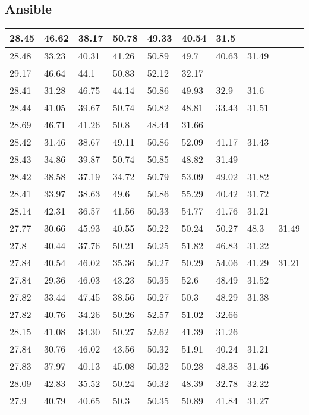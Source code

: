 \subsection{Ansible}
\label{dataset:deploytijden:ansible}
\begin{longtable}{ | l | l | l | l | l | l | l | l | l | }
\hline
	28.45 & 46.62 & 38.17 & 50.78 & 49.33 & 40.54 & 31.5 &  &  \\ \hline
	28.48 & 33.23 & 40.31 & 41.26 & 50.89 & 49.7 & 40.63 & 31.49 &  \\ \hline
	29.17 & 46.64 & 44.1 & 50.83 & 52.12 & 32.17 &  &  &  \\ \hline
	28.41 & 31.28 & 46.75 & 44.14 & 50.86 & 49.93 & 32.9 & 31.6 &  \\ \hline
	28.44 & 41.05 & 39.67 & 50.74 & 50.82 & 48.81 & 33.43 & 31.51 &  \\ \hline
	28.69 & 46.71 & 41.26 & 50.8 & 48.44 & 31.66 &  &  &  \\ \hline
	28.42 & 31.46 & 38.67 & 49.11 & 50.86 & 52.09 & 41.17 & 31.43 &  \\ \hline
	28.43 & 34.86 & 39.87 & 50.74 & 50.85 & 48.82 & 31.49 &  &  \\ \hline
	28.42 & 38.58 & 37.19 & 34.72 & 50.79 & 53.09 & 49.02 & 31.82 &  \\ \hline
	28.41 & 33.97 & 38.63 & 49.6 & 50.86 & 55.29 & 40.42 & 31.72 &  \\ \hline
	28.14 & 42.31 & 36.57 & 41.56 & 50.33 & 54.77 & 41.76 & 31.21 &  \\ \hline
	27.77 & 30.66 & 45.93 & 40.55 & 50.22 & 50.24 & 50.27 & 48.3 & 31.49 \\ \hline
	27.8 & 40.44 & 37.76 & 50.21 & 50.25 & 51.82 & 46.83 & 31.22 &  \\ \hline
	27.84 & 40.54 & 46.02 & 35.36 & 50.27 & 50.29 & 54.06 & 41.29 & 31.21 \\ \hline
	27.84 & 29.36 & 46.03 & 43.23 & 50.35 & 52.6 & 48.49 & 31.52 &  \\ \hline
	27.82 & 33.44 & 47.45 & 38.56 & 50.27 & 50.3 & 48.29 & 31.38 &  \\ \hline
	27.82 & 40.76 & 34.26 & 50.26 & 52.57 & 51.02 & 32.66 &  &  \\ \hline
	28.15 & 41.08 & 34.30 & 50.27 & 52.62 & 41.39 & 31.26 &  &  \\ \hline
	27.84 & 30.76 & 46.02 & 43.56 & 50.32 & 51.91 & 40.24 & 31.21 &  \\ \hline
	27.83 & 37.97 & 40.13 & 45.08 & 50.32 & 50.28 & 48.38 & 31.46 &  \\ \hline
	28.09 & 42.83 & 35.52 & 50.24 & 50.32 & 48.39 & 32.78 & 32.22 &  \\ \hline
	27.9 & 40.79 & 40.65 & 50.3 & 50.35 & 50.89 & 41.84 & 31.27 &  \\ \hline
\end{longtable}




